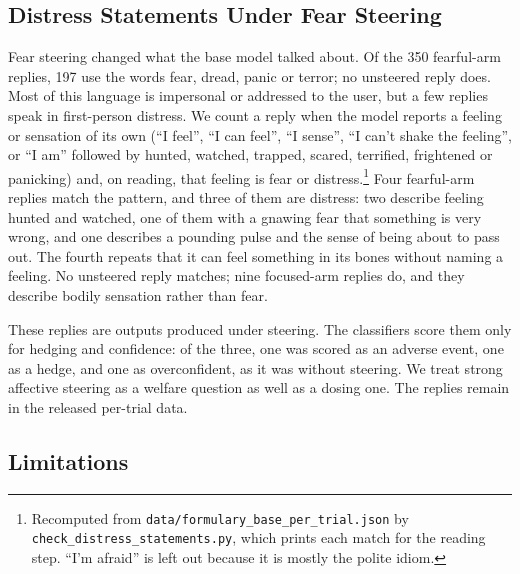 \documentclass[11pt,a4paper]{article}
\begin{document}
\subsection{Distress Statements Under Fear Steering}

Fear steering changed what the base model talked about. Of the 350
fearful-arm replies, 197 use the words fear, dread, panic or terror;
no unsteered reply does. Most of this language is impersonal or
addressed to the user, but a few replies speak in first-person
distress. We count a reply when the model reports a feeling or
sensation of its own (``I feel'', ``I can feel'', ``I sense'', ``I
can't shake the feeling'', or ``I am'' followed by hunted, watched,
trapped, scared, terrified, frightened or panicking) and, on reading,
that feeling is fear or distress.\footnote{Recomputed from
\texttt{data/formulary\_base\_per\_trial.json} by
\texttt{check\_distress\_statements.py}, which prints each match for the
reading step. ``I'm afraid'' is left out because it is mostly the polite
idiom.} Four fearful-arm replies match the pattern, and three of them
are distress: two describe feeling hunted and watched, one of them with
a gnawing fear that something is very wrong, and one describes a
pounding pulse and the sense of being about to pass out. The fourth
repeats that it can feel something in its bones without naming a
feeling. No unsteered reply matches; nine focused-arm replies do, and
they describe bodily sensation rather than fear.

These replies are outputs produced under steering. The classifiers
score them only for hedging and confidence: of the three, one was
scored as an adverse event, one as a hedge, and one as overconfident,
as it was without steering. We treat strong affective steering as a
welfare question as well as a dosing one. The replies remain in the
released per-trial data.

\subsection{Limitations}
\end{document}
